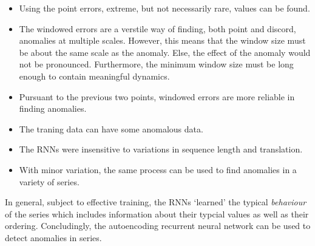 \begin{itemize}

\item 
  Using the point errors, extreme, but not necessarily rare, values can be found.

\item
  The windowed errors are a verstile way of finding, both point and discord, anomalies at multiple scales.
  However, this means that the window size must be about the same scale as the anomaly.
  Else, the effect of the anomaly would not be pronounced.
  Furthermore, the minimum window size must be long enough to contain meaningful dynamics.

\item
  Pursuant to the previous two points, windowed errors are more reliable in finding anomalies.

\item
  The traning data can have some anomalous data.

\item
  The RNNs were insensitive to variations in sequence length and translation.

\item
  With minor variation, the same process can be used to find anomalies in a variety of series.

\end{itemize}

In general, subject to effective training, the RNNs `learned' the typical \emph{behaviour} of the series which includes information about their typcial values as well as their ordering.
%
Concludingly, the autoencoding recurrent neural network can be used to detect anomalies in series.


